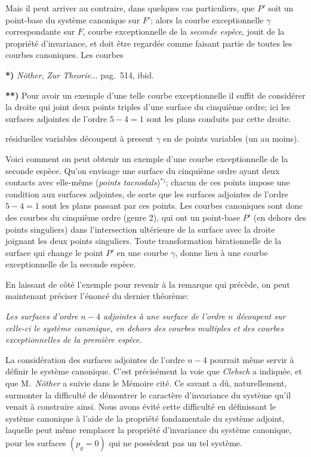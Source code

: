 \documentclass{article}
\begin{document}
Mais il peut arriver au contraire, dans quelques cas particuliers, que $P'$ soit un point-base du système canonique sur $F'$; alors la courbe exceptionnelle $\gamma$ correspondante sur $F$, courbe exceptionnelle de la \emph{seconde espèce}, jouit de la propriété d'invariance, et doit être regardée comme faisant partie de toutes les courbes canoniques. Les courbes

\textbf{*)} \emph{Nöther}, \emph{Zur Theorie}... pag.\ 514, ibid.

\textbf{**)} Pour avoir un exemple d'une telle courbe exceptionnelle il suffit de considérer la droite qui joint deux points triples d'une surface du cinquième ordre; ici les surfaces adjointes de l'ordre $5-4=1$ sont les plans conduits par cette droite.

résiduelles variables découpent à present $\gamma$ en de points variables (un au moins).

Voici comment on peut obtenir un exemple d'une courbe exceptionnelle de la seconde espèce. Qu'on envisage une surface du cinquième ordre ayant deux contacts avec elle-même (\emph{points tacnodals})${}^{*)}$; chacun de ces points impose une condition aux surfaces adjointes, de sorte que les surfaces adjointes de l'ordre $5-4=1$ sont les plans passant par ces points. Les courbes canoniques sont donc des courbes du cinquième ordre (genre 2), qui ont un point-base $P'$ (en dehors des points singuliers) dans l'intersection ultérieure de la surface avec la droite joignant les deux points singuliers. Toute transformation birationnelle de la surface qui change le point $P'$ en une courbe $\gamma$, donne lieu à une courbe exceptionnelle de la seconde espèce.

En laissant de côté l'exemple pour revenir à la remarque qui précède, on peut maintenant préciser l'énoncé du dernier théorème:

\emph{Les surfaces d'ordre $n-4$ adjointes à une surface de l'ordre $n$ découpent sur celle-ci le système canonique, en dehors des courbes multiples et des courbes exceptionnelles de la première espèce.}

La considération des surfaces adjointes de l'ordre $n-4$ pourrait même servir à définir le système canonique. C'est précisément la voie que \emph{Clebsch} a indiquée, et que M.\ \emph{Nöther} a suivie dans le Mémoire cité. Ce savant a dû, naturellement, surmonter la difficulté de démontrer le caractère d'invariance du système qu'il venait à construire ainsi. Nous avons évité cette difficulté en définissant le système canonique à l'aide de la propriété fondamentale du système adjoint, laquelle peut même remplacer la propriété d'invariance du système canonique, pour les surfaces $(p_{g} = 0)$ qui ne possèdent pas un tel système.
\end{document}
